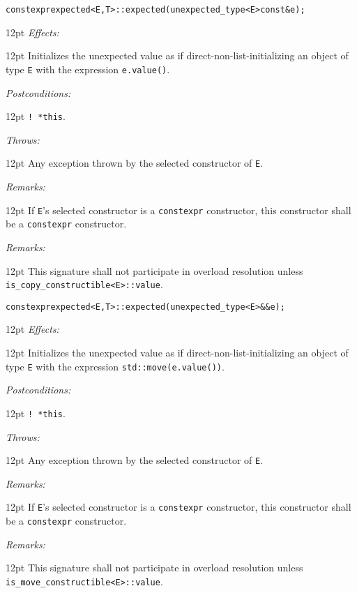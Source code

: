 \documentclass[a4paper,10pt]{article}
\newcommand{\cpp}[1]{\lstinline{#1}}
\newcommand{\wordingItem}[1]{\noindent\textit{#1:}}
\newenvironment{wordingTextItem}[1]{\wordingItem{#1}\vspace{2pt}\noindent\begin{adjustwidth}{12pt}{}}{\vspace{2pt}\end{adjustwidth}}
\newenvironment{wordingPara}{\begin{adjustwidth}{12pt}{}}{\end{adjustwidth}}
\newcommand{\suppress}[1]{\colorbox{suppress_color}{#1}}
\begin{document}
\begin{alltt}
constexpr \suppress{expected<E,T>::}expected(unexpected_type<E> const& e);
\end{alltt}
\begin{wordingPara}
\begin{wordingTextItem}{Effects}
Initializes the unexpected value as if direct-non-list-initializing an object of type \cpp{E} with the expression \cpp{e.value()}.
\end{wordingTextItem}
\begin{wordingTextItem}{Postconditions}
\cpp{! *this}.
\end{wordingTextItem}
\begin{wordingTextItem}{Throws}
Any exception thrown by the selected constructor of \cpp{E}.
\end{wordingTextItem}
\begin{wordingTextItem}{Remarks}
If \cpp{E}'s selected constructor is a \cpp{constexpr} constructor, this constructor shall be a \cpp{constexpr} constructor.
\end{wordingTextItem}
\begin{wordingTextItem}{Remarks}
This signature shall not participate in overload resolution unless\\
\cpp{is_copy_constructible<E>::value}. 
\end{wordingTextItem}
\end{wordingPara}

\begin{alltt}
constexpr \suppress{expected<E,T>::}expected(unexpected_type<E>&& e); 
\end{alltt}
\begin{wordingPara}
\begin{wordingTextItem}{Effects}
Initializes the unexpected value as if direct-non-list-initializing an object of type \cpp{E} with the expression \cpp{std::move(e.value())}.
\end{wordingTextItem}
\begin{wordingTextItem}{Postconditions}
\cpp{! *this}.
\end{wordingTextItem}
\begin{wordingTextItem}{Throws}
Any exception thrown by the selected constructor of \cpp{E}.
\end{wordingTextItem}
\begin{wordingTextItem}{Remarks}
If \cpp{E}'s selected constructor is a \cpp{constexpr} constructor, this constructor shall be a \cpp{constexpr} constructor.
\end{wordingTextItem}
\begin{wordingTextItem}{Remarks}
This signature shall not participate in overload resolution unless\\
\cpp{is_move_constructible<E>::value}.
\end{wordingTextItem}
\end{wordingPara}
\end{document}
